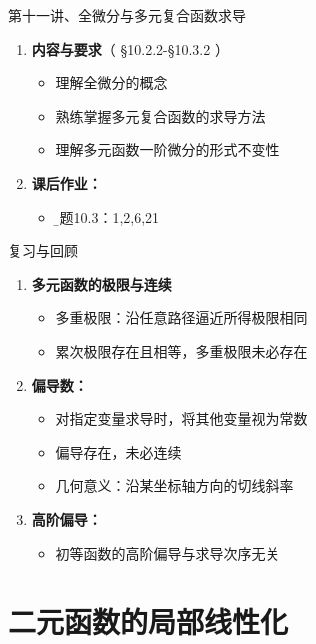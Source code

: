 

\begin{frame}{第十一讲、全微分与多元复合函数求导}
	\linespread{1.5}
	\begin{enumerate}
	  \item {\bf 内容与要求}{\color{blue}（ \S10.2.2-\S10.3.2 ）}
	  \begin{itemize}
	    \item 理解全微分的概念
	    \item 熟练掌握多元复合函数的求导方法
	    \item 理解多元函数一阶微分的形式不变性
	  \vspace{1em}
	  \end{itemize}
	  \item {\bf  课后作业：}
	  \begin{itemize}
	    \item {\b 习题10.3：1,2,6,21}
	  \end{itemize}
	\end{enumerate}
\end{frame}

\begin{frame}[<+->]{复习与回顾}
	\linespread{1.5}
	\begin{enumerate}
	  \item {\bf 多元函数的极限与连续}
	  \begin{itemize}
	    \item 多重极限：沿任意路径逼近所得极限相同
	    \item 累次极限存在且相等，多重极限未必存在
	  \end{itemize}
	  \item {\bf 偏导数：}
	  \begin{itemize}
	    \item 对指定变量求导时，将其他变量视为常数
	    \item 偏导存在，未必连续
	    \item 几何意义：沿某坐标轴方向的切线斜率
	  \end{itemize}
	  \item {\bf 高阶偏导：}
	  \begin{itemize}
	    \item 初等函数的高阶偏导与求导次序无关
	  \end{itemize}
	\end{enumerate}
\end{frame}

\section{二元函数的局部线性化}

